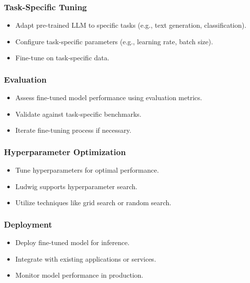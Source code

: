 \begin{frame}[fragile]\frametitle{Task-Specific Tuning}
    \begin{itemize}
        \item Adapt pre-trained LLM to specific tasks (e.g., text generation, classification).
        \item Configure task-specific parameters (e.g., learning rate, batch size).
        \item Fine-tune on task-specific data.
    \end{itemize}
\end{frame}

\begin{frame}[fragile]\frametitle{Evaluation}
    \begin{itemize}
        \item Assess fine-tuned model performance using evaluation metrics.
        \item Validate against task-specific benchmarks.
        \item Iterate fine-tuning process if necessary.
    \end{itemize}
\end{frame}

\begin{frame}[fragile]\frametitle{Hyperparameter Optimization}
    \begin{itemize}
        \item Tune hyperparameters for optimal performance.
        \item Ludwig supports hyperparameter search.
        \item Utilize techniques like grid search or random search.
    \end{itemize}
\end{frame}

\begin{frame}[fragile]\frametitle{Deployment}
    \begin{itemize}
        \item Deploy fine-tuned model for inference.
        \item Integrate with existing applications or services.
        \item Monitor model performance in production.
    \end{itemize}
\end{frame}


